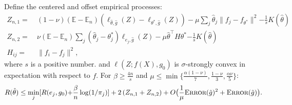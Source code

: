 \documentclass[12pt]{extarticle} %
\newcommand{\E}{\mathbb{E}}
\newcommand{\error}{\ensuremath{\textsc{Error}}}
\begin{document}
\begin{lemma}\label{lem:main}
Define the centered and offset empirical processes:
\begin{align*}
    Z_{n,1} =~& (1-\nu)(\E-\E_n) (\ell_{\hat{\theta}, \hat{g}}(Z) - \ell_{\theta^*, \hat{g}}(Z)) - \mu \sum_{j} \hat{\theta}_j \|f_j - f_{\theta^*}\|^2 {-\frac{1}{s}K(\hat{\theta})}\\
    Z_{n,2} =~& \nu(\E-\E_n) \sum_{j} (\hat{\theta}_j-\theta_j^*)\ell_{e_j, \hat{g}}(Z) - \mu \hat{\theta}^\top H \theta^* {-\frac{1}{s}K(\hat{\theta})}\\
    H_{ij} =~& \|f_i - f_j\|^2 ,
\end{align*}
where $s$ is a positive number. 
and $\ell(Z; f(X), g_0)$ is $\sigma$-strongly convex in expectation with respect to $f$. For {$\beta \geq \frac{4n}{s}$} and $\mu \leq \min\{\frac{\alpha(1-\nu)}{7}, \frac{1-\nu}{3}, \frac{\alpha\nu}{5}\}$:
\begin{align*}
    R(\hat{\theta}) \leq \min_{j} [R(e_j, g_0){+ \frac{\beta}{n} \log(1/\pi_j)}] + 2\, (Z_{n,1} + Z_{n,2}) + O\big(\frac{1}{\mu}\error(\hat{g})^2 + \error(\hat{g})\big) .\label{eqn:lemma9}
\end{align*}
\end{lemma}
\end{document}
